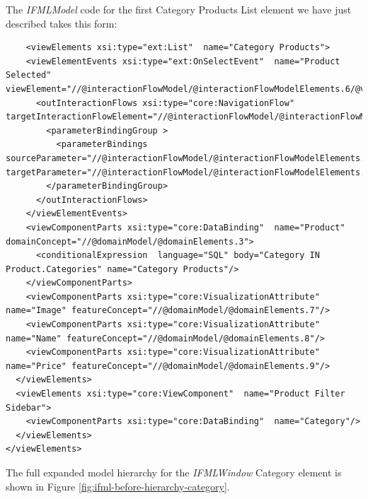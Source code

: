 The \textit{IFMLModel} code for the first Category Products List element we have just described takes this form: 
\vspace{0.5cm}
\lstset{language=XML}
\begin{lstlisting} 
    <viewElements xsi:type="ext:List"  name="Category Products">
    <viewElementEvents xsi:type="ext:OnSelectEvent"  name="Product Selected" viewElement="//@interactionFlowModel/@interactionFlowModelElements.6/@viewElements.1/@viewElements.0">
      <outInteractionFlows xsi:type="core:NavigationFlow"  targetInteractionFlowElement="//@interactionFlowModel/@interactionFlowModelElements.1">
        <parameterBindingGroup >
          <parameterBindings  sourceParameter="//@interactionFlowModel/@interactionFlowModelElements.1/@parameters.0" targetParameter="//@interactionFlowModel/@interactionFlowModelElements.1/@parameters.0"/>
        </parameterBindingGroup>
      </outInteractionFlows>
    </viewElementEvents>
    <viewComponentParts xsi:type="core:DataBinding"  name="Product" domainConcept="//@domainModel/@domainElements.3">
      <conditionalExpression  language="SQL" body="Category IN Product.Categories" name="Category Products"/>
    </viewComponentParts>
    <viewComponentParts xsi:type="core:VisualizationAttribute"  name="Image" featureConcept="//@domainModel/@domainElements.7"/>
    <viewComponentParts xsi:type="core:VisualizationAttribute"  name="Name" featureConcept="//@domainModel/@domainElements.8"/>
    <viewComponentParts xsi:type="core:VisualizationAttribute"  name="Price" featureConcept="//@domainModel/@domainElements.9"/>
  </viewElements>
  <viewElements xsi:type="core:ViewComponent"  name="Product Filter Sidebar">
    <viewComponentParts xsi:type="core:DataBinding"  name="Category"/>
  </viewElements>
</viewElements>
\end{lstlisting}

The full expanded model hierarchy for the \textit{IFMLWindow} Category element is shown in Figure \ref{fig:ifml-before-hierarchy-category}.

